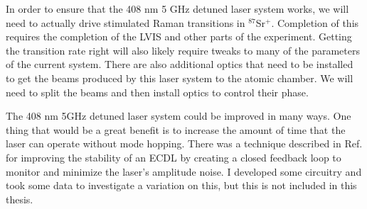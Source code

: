 In order to ensure that the 408 nm 5 GHz detuned laser system works, we will need to actually drive stimulated Raman transitions in $^{87}$Sr$^+$. Completion of this requires the completion of the LVIS and other parts of the experiment. Getting the transition rate right will also likely require tweaks to many of the parameters of the current system. There are also additional optics that need to be installed to get the beams produced by this laser system to the atomic chamber. We will need to split the beams and then install optics to control their phase. 

The 408 nm 5GHz detuned laser system could be improved in many ways. One thing that would be a great benefit is to increase the amount of time that the laser can operate without mode hopping. There was a technique described in Ref.\,\cite{chiowChuLock} for improving the stability of an ECDL by creating a closed feedback loop to monitor and minimize the laser's amplitude noise. I developed some circuitry and took some data to investigate a variation on this, but this is not included in this thesis. 


